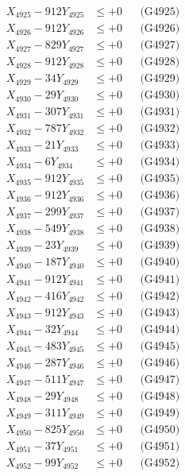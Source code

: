 \documentclass[a4paper,10pt]{article}
\begin{document}
{\begin{align}
X_{4925} - 912Y_{4925} &\leq +0 && \text{(G4925)} \\
X_{4926} - 912Y_{4926} &\leq +0 && \text{(G4926)} \\
X_{4927} - 829Y_{4927} &\leq +0 && \text{(G4927)} \\
X_{4928} - 912Y_{4928} &\leq +0 && \text{(G4928)} \\
X_{4929} - 34Y_{4929} &\leq +0 && \text{(G4929)} \\
X_{4930} - 29Y_{4930} &\leq +0 && \text{(G4930)} \\
\allowbreak
X_{4931} - 307Y_{4931} &\leq +0 && \text{(G4931)} \\
X_{4932} - 787Y_{4932} &\leq +0 && \text{(G4932)} \\
X_{4933} - 21Y_{4933} &\leq +0 && \text{(G4933)} \\
X_{4934} - 6Y_{4934} &\leq +0 && \text{(G4934)} \\
X_{4935} - 912Y_{4935} &\leq +0 && \text{(G4935)} \\
X_{4936} - 912Y_{4936} &\leq +0 && \text{(G4936)} \\
X_{4937} - 299Y_{4937} &\leq +0 && \text{(G4937)} \\
X_{4938} - 549Y_{4938} &\leq +0 && \text{(G4938)} \\
X_{4939} - 23Y_{4939} &\leq +0 && \text{(G4939)} \\
X_{4940} - 187Y_{4940} &\leq +0 && \text{(G4940)} \\
\allowbreak
X_{4941} - 912Y_{4941} &\leq +0 && \text{(G4941)} \\
X_{4942} - 416Y_{4942} &\leq +0 && \text{(G4942)} \\
X_{4943} - 912Y_{4943} &\leq +0 && \text{(G4943)} \\
X_{4944} - 32Y_{4944} &\leq +0 && \text{(G4944)} \\
X_{4945} - 483Y_{4945} &\leq +0 && \text{(G4945)} \\
X_{4946} - 287Y_{4946} &\leq +0 && \text{(G4946)} \\
X_{4947} - 511Y_{4947} &\leq +0 && \text{(G4947)} \\
X_{4948} - 29Y_{4948} &\leq +0 && \text{(G4948)} \\
X_{4949} - 311Y_{4949} &\leq +0 && \text{(G4949)} \\
X_{4950} - 825Y_{4950} &\leq +0 && \text{(G4950)} \\
\allowbreak
X_{4951} - 37Y_{4951} &\leq +0 && \text{(G4951)} \\
X_{4952} - 99Y_{4952} &\leq +0 && \text{(G4952)} \\

\end{align}}
\end{document}
